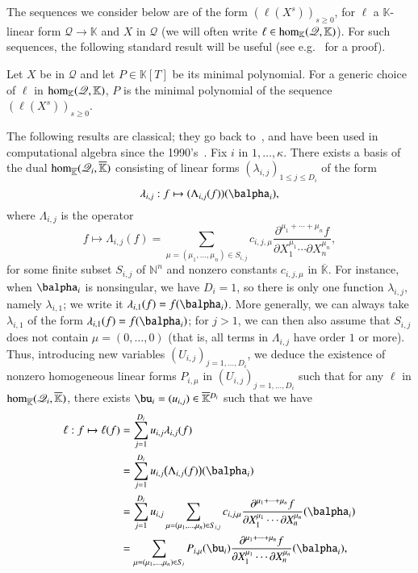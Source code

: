 \documentclass[final,1p,times,authoryear]{elsarticle}
\newcommand{\lf}{X}
\newcommand{\residueI}{\mathscr{Q}}
\def\dg{\kappa}
\def\N {\ensuremath{\mathbb{N}}}
\def\K{\mathbb{K}}
\def\K {\ensuremath{\mathbb{K}}}
\def\Kbar {{\ensuremath{\overline{\mathbb{K}}}}}
\def\D {\ensuremath{D}}
\begin{document}
The sequences we consider below are of the form $(\ell(\lf^s))_{s \ge
0}$, for $\ell$ a $\K$-linear form $\residueI \to \K$ and $\lf$ in $\residueI$
(we will often write $\ell \in {\rm hom}_\K(\residueI,\K)$). For
such sequences, the following standard result will be useful
(see e.g.~\citep[Propositions~1 \& 2]{BoSaSc03} for a proof).
\begin{lemma}\label{lemma:minpoly}
  Let $\lf$ be in $\residueI$ and let $P \in \K[T]$ be its minimal
  polynomial. For a generic choice of $\ell$ in ${\rm hom}_\K(\residueI,\K)$,
  $P$ is the minimal polynomial of the sequence $(\ell(\lf^s))_{s \ge
  0}$.
\end{lemma}

The following results are classical; they go back
to~\citep{Macaulay16}, and have been used in computational algebra
since the 1990's~\citep{MaMoMo96,Mourrain97}. Fix $i$ in $1,\dots,\dg$.
There exists a basis of the dual ${\rm hom}_\Kbar(\residueI_i,\Kbar)$
consisting of linear forms $(\lambda_{i,j})_{1\le j \le \D_i}$ of the
form
$$\lambda_{i,j}: f \mapsto (\Lambda_{i,j}(f))(\balpha_i),$$
where $\Lambda_{i,j}$ is the operator
$$f \mapsto \Lambda_{i,j}(f) = \sum_{\mu=(\mu_1,\dots,\mu_n) \in
S_{i,j}} c_{i,j,\mu} \frac{ \partial^{\mu_1 + \cdots + \mu_n} f}
{\partial X_1^{\mu_1} \cdots \partial X_n^{\mu_n}},$$ for some finite
subset $S_{i,j}$ of $\N^n$ and nonzero constants $c_{i,j,\mu}$ in
$\Kbar$. 
For instance, when $\balpha_i$ is nonsingular, we have $D_i=1$, so
there is only one function $\lambda_{i,j}$, namely $\lambda_{i,1}$; we
write it $\lambda_{i,1}(f) = f(\balpha_i)$.
More generally, we can always take $\lambda_{i,1}$ of the form
$\lambda_{i,1}(f) = f(\balpha_i)$; for $j>1$, we can then also assume
that $S_{i,j}$ does not contain $\mu=(0,\dots,0)$ (that is, all terms
in $\Lambda_{i,j}$ have order $1$ or more). Thus, introducing new
variables $(U_{i,j})_{j =1,\dots,D_i}$, we deduce the existence of
nonzero homogeneous linear forms $P_{i,\mu}$ in
$(U_{i,j})_{j=1,\dots,D_i}$ such that for any $\ell$ in ${\rm
hom}_\Kbar(\residueI_i,\Kbar)$, there exists $\bu_i=(u_{i,j}) \in
\Kbar{}^{D_i}$ such that we have
\begin{align}\label{ell_param}
  \ell: f \mapsto \ell(f)
&= \sum_{j=1}^{D_i} u_{i,j} \lambda_{i,j}(f)\nonumber\\
&= \sum_{j=1}^{D_i} u_{i,j} \big(\Lambda_{i,j}(f)\big)(\balpha_i)\nonumber\\
&= \sum_{j=1}^{D_i} u_{i,j}
\sum_{\mu=(\mu_1,\dots,\mu_n) \in
S_{i,j}} c_{i,j,\mu} \frac{ \partial^{\mu_1 + \cdots + \mu_n} f}
{\partial X_1^{\mu_1} \cdots \partial X_n^{\mu_n}}(\balpha_i)\nonumber\\
&= \sum_{\mu=(\mu_1,\dots,\mu_n) \in S_i} P_{i,\mu}(\bu_i)
\frac{ \partial^{\mu_1 + \cdots + \mu_n} f}
{\partial X_1^{\mu_1} \cdots \partial X_n^{\mu_n}}(\balpha_i),
\end{align}
\end{document}
